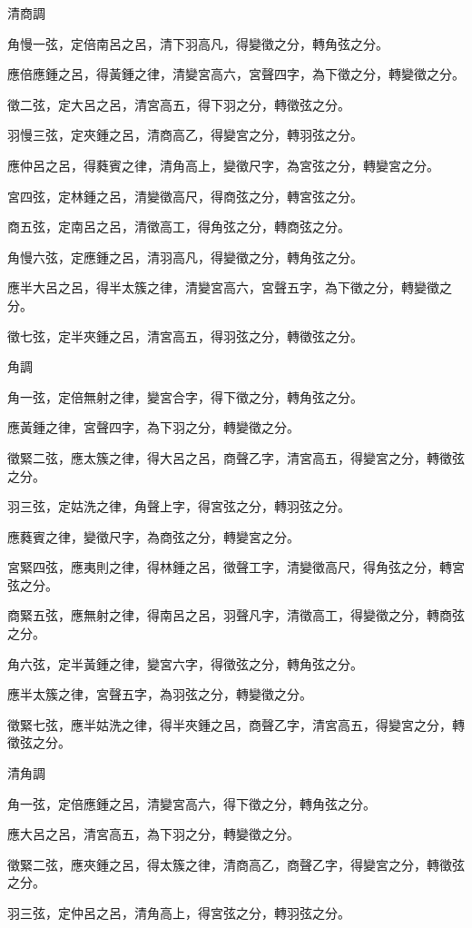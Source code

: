 \begin{pinyinscope}
清商調

角慢一弦，定倍南呂之呂，清下羽高凡，得變徵之分，轉角弦之分。

應倍應鍾之呂，得黃鍾之律，清變宮高六，宮聲四字，為下徵之分，轉變徵之分。

徵二弦，定大呂之呂，清宮高五，得下羽之分，轉徵弦之分。

羽慢三弦，定夾鍾之呂，清商高乙，得變宮之分，轉羽弦之分。

應仲呂之呂，得蕤賓之律，清角高上，變徵尺字，為宮弦之分，轉變宮之分。

宮四弦，定林鍾之呂，清變徵高尺，得商弦之分，轉宮弦之分。

商五弦，定南呂之呂，清徵高工，得角弦之分，轉商弦之分。

角慢六弦，定應鍾之呂，清羽高凡，得變徵之分，轉角弦之分。

應半大呂之呂，得半太簇之律，清變宮高六，宮聲五字，為下徵之分，轉變徵之分。

徵七弦，定半夾鍾之呂，清宮高五，得羽弦之分，轉徵弦之分。

角調

角一弦，定倍無射之律，變宮合字，得下徵之分，轉角弦之分。

應黃鍾之律，宮聲四字，為下羽之分，轉變徵之分。

徵緊二弦，應太簇之律，得大呂之呂，商聲乙字，清宮高五，得變宮之分，轉徵弦之分。

羽三弦，定姑洗之律，角聲上字，得宮弦之分，轉羽弦之分。

應蕤賓之律，變徵尺字，為商弦之分，轉變宮之分。

宮緊四弦，應夷則之律，得林鍾之呂，徵聲工字，清變徵高尺，得角弦之分，轉宮弦之分。

商緊五弦，應無射之律，得南呂之呂，羽聲凡字，清徵高工，得變徵之分，轉商弦之分。

角六弦，定半黃鍾之律，變宮六字，得徵弦之分，轉角弦之分。

應半太簇之律，宮聲五字，為羽弦之分，轉變徵之分。

徵緊七弦，應半姑洗之律，得半夾鍾之呂，商聲乙字，清宮高五，得變宮之分，轉徵弦之分。

清角調

角一弦，定倍應鍾之呂，清變宮高六，得下徵之分，轉角弦之分。

應大呂之呂，清宮高五，為下羽之分，轉變徵之分。

徵緊二弦，應夾鍾之呂，得太簇之律，清商高乙，商聲乙字，得變宮之分，轉徵弦之分。

羽三弦，定仲呂之呂，清角高上，得宮弦之分，轉羽弦之分。


\end{pinyinscope}
